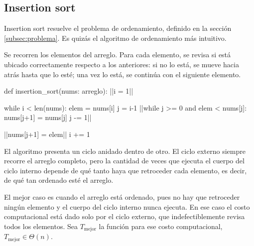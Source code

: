 \subsection{Insertion sort}

Insertion sort resuelve el problema de ordenamiento, definido en la sección \ref{subsec:problema}. Es quizás el algoritmo de ordenamiento más intuitivo. 

Se recorren los elementos del arreglo. Para cada elemento, se revisa si está ubicado correctamente respecto a los anteriores: si no lo está, se mueve hacia atrás hasta que lo esté; una vez lo está, se continúa con el siguiente elemento.

\begin{pseudocode}
def insertion_sort(nums: arreglo):
    ||i = 1||

    while i < len(nums):
        elem = nums[i] 
        j = i-1
        ||while j >= 0 and elem < nums[j]:
            nums[j+1] = nums[j]
            j -= 1||
        
        ||nums[j+1] = elem||
        i += 1
\end{pseudocode}
\begin{annotations}
\end{annotations}

El algoritmo presenta un ciclo anidado dentro de otro. El ciclo externo siempre recorre el arreglo completo, pero la cantidad de veces que ejecuta el cuerpo del ciclo interno depende de qué tanto haya que retroceder cada elemento, es decir, de qué tan ordenado esté el arreglo.

El mejor caso es cuando el arreglo está ordenado, pues no hay que retroceder ningún elemento y el cuerpo del ciclo interno nunca ejecuta. En ese caso el costo computacional está dado solo por el ciclo externo, que indefectiblemente revisa todos los elementos. Sea \(T_\text{mejor}\) la función para ese costo computacional, \(T_\text{mejor} \in \Theta(n)\).

